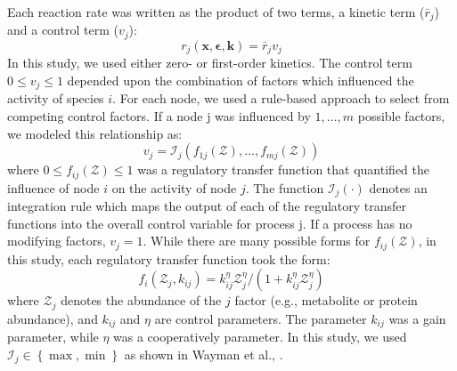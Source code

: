 \documentclass[10pt,twocolumn,twoside,final]{IEEEtran}
\begin{document}
Each reaction rate was written as the product of two terms, a kinetic term ($\bar{r}_{j}$) and a control term ($v_{j}$):
\begin{equation}\label{eqn:rate-factor}
	r_{j}\left(\mathbf{x},\mathbf{\epsilon},\mathbf{k}\right) = \bar{r}_{j}v_{j}
\end{equation}
In this study, we used either zero- or first-order kinetics.
The control term $0\leq v_{j}\leq 1$ depended upon the combination of factors which influenced the activity of species $i$.
For each node, we used a rule-based approach to select from competing control factors.
If a node j was influenced by $1,\dots,m$ possible factors, we modeled this relationship as:
\begin{equation}
	v_{j} = \mathcal{I}_{j}\left(f_{1j}\left(\mathcal{Z}\right),\hdots,f_{mj}\left(\mathcal{Z}\right)\right)
\end{equation}where $0\leq f_{ij}\left(\mathcal{Z}\right)\leq 1$ was a regulatory transfer function that quantified the influence of node $i$ on the activity of node $j$.
The function $\mathcal{I}_{j}\left(\cdot\right)$ denotes an integration rule which maps the output of each of the regulatory transfer functions into the overall control
variable for process j.
If a process has no modifying factors, $v_{j} = 1$.
While there are many possible forms for $f_{ij}\left(\mathcal{Z}\right)$, in this study, each regulatory transfer function took the form:
\begin{equation}\label{eqn:control-factor}
	f_{i}\left(\mathcal{Z}_{j},k_{ij}\right) = k_{ij}^{\eta}\mathcal{Z}_{j}^{\eta}/\left({1 + k_{ij}^{\eta}\mathcal{Z}_{j}^{\eta}}\right)
\end{equation}where $\mathcal{Z}_{j}$ denotes the abundance of the $j$ factor (e.g., metabolite or protein abundance), and $k_{ij}$ and $\eta$ are control parameters.
The parameter $k_{ij}$ was a gain parameter, while $\eta$ was a cooperatively parameter.
In this study, we used $\mathcal{I}_{j}\in\left\{\max,\min\right\}$ as shown in Wayman et al., \cite{pr3010138}.
\end{document}
